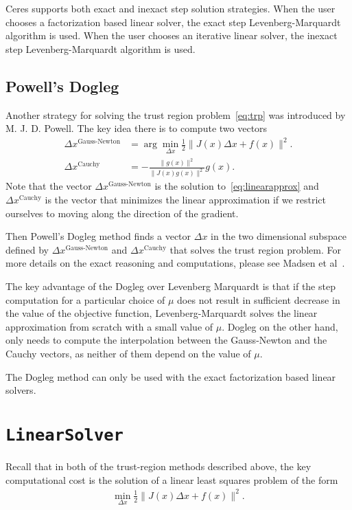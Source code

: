 Ceres supports both exact and inexact step solution strategies. When the user chooses a factorization based linear solver, the exact step Levenberg-Marquardt algorithm is used. When the user chooses an iterative linear solver, the inexact step Levenberg-Marquardt algorithm is used.

\subsection{Powell's Dogleg}
Another strategy for solving the trust region problem~\eqref{eq:trp} was introduced by M. J. D. Powell. The key idea there is to compute two vectors
\begin{align}
	\Delta x^{\text{Gauss-Newton}} &= \arg \min_{\Delta x}\frac{1}{2} \|J(x)\Delta x + f(x)\|^2.\\
	\Delta x^{\text{Cauchy}} &= -\frac{\|g(x)\|^2}{\|J(x)g(x)\|^2}g(x). 
\end{align}
Note that the vector $\Delta x^{\text{Gauss-Newton}}$ is the solution to~\eqref{eq:linearapprox} and $\Delta x^{\text{Cauchy}}$ is the vector that minimizes the linear approximation if we restrict ourselves to moving along the direction of the gradient.

Then Powell's Dogleg method finds a vector $\Delta x$ in the two dimensional subspace defined by $\Delta x^{\text{Gauss-Newton}}$ and $\Delta x^{\text{Cauchy}}$ that solves the trust region problem. For more details on the exact reasoning and computations, please see Madsen et al~\cite{madsen2004methods}.

The key advantage of the Dogleg over Levenberg Marquardt is that if the step computation for a particular choice of $\mu$ does not result in sufficient decrease in the value of the objective function, Levenberg-Marquardt solves the linear approximation from scratch with a small value of $\mu$. Dogleg on the other hand, only needs to compute the interpolation between the Gauss-Newton and the Cauchy vectors, as neither of them depend on the value of $\mu$.

The Dogleg method can only be used with the exact factorization based linear solvers.

\section{\texttt{LinearSolver}}
Recall that in both of the trust-region methods described above, the key computational cost is the solution of a linear least squares problem of the form
\begin{align}
 \min_{\Delta x} \frac{1}{2} \|J(x)\Delta x + f(x)\|^2 .
 \label{eq:simple2}
\end{align}


